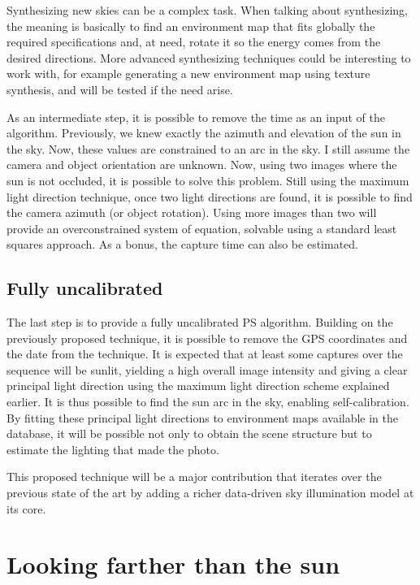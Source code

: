 Synthesizing new skies can be a complex task. When talking about synthesizing, the meaning is basically to find an environment map that fits globally the required specifications and, at need, rotate it so the energy comes from the desired directions. More advanced synthesizing techniques could be interesting to work with, for example generating a new environment map using texture synthesis, and will be tested if the need arise.

As an intermediate step, it is possible to remove the time as an input of the algorithm. Previously, we knew exactly the azimuth and elevation of the sun in the sky. Now, these values are constrained to an arc in the sky. I still assume the camera and object orientation are unknown. Now, using two images where the sun is not occluded, it is possible to solve this problem. Still using the maximum light direction technique, once two light directions are found, it is possible to find the camera azimuth (or object rotation). Using more images than two will provide an overconstrained system of equation, solvable using a standard least squares approach. As a bonus, the capture time can also be estimated.


\subsection{Fully uncalibrated}
The last step is to provide a fully uncalibrated PS algorithm. Building on the previously proposed technique, it is possible to remove the GPS coordinates and the date from the technique. It is expected that at least some captures over the sequence will be sunlit, yielding a high overall image intensity and giving a clear principal light direction using the maximum light direction scheme explained earlier. It is thus possible to find the sun arc in the sky, enabling self-calibration. By fitting these principal light directions to environment maps available in the database, it will be possible not only to obtain the scene structure but to estimate the lighting that made the photo.

This proposed technique will be a major contribution that iterates over the previous state of the art by adding a richer data-driven sky illumination model at its core.


\section{Looking farther than the sun}

